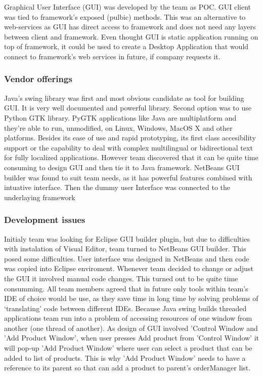 \documentclass[pdftex,11pt,a4paper]{article}
\begin{document}
Graphical User Interface (GUI) was developed by the team as POC. GUI client was tied to framework's exposed (pulbic) methods. This was an alternative to web-services as GUI has direct access to framework and does not need any layers between client and framework. Even thought GUI is static application running on top of framework, it could be used to create a Desktop Application that would connect to framework's web services in future, if company requests it.

\subsubsection{Vendor offerings}
Java's swing library was first and most obvious candidate as tool for building GUI. It is very well documented and powerful library. Second option was to use  Python GTK library. PyGTK applications like Java are multiplatform and they're able to run, unmodified, on Linux, Windows, MacOS X and other platforms.
Besides its ease of use and rapid prototyping, its first class accesibility support or the capability to deal with complex multilingual or bidirectional text for fully localized applications. However team discovered that it can be quite time consuming to design GUI and then tie it to Java framework.
NetBeans GUI builder was found to suit team needs, as it has powerful features combined with intuative interface. Then the dummy user Interface was connected to the underlaying framework

\subsubsection{Development issues}
Initialy team was looking for Eclipse GUI builder plugin, but due to difficulties with instalation of Visual Editor, team turned to NetBeans GUI builder. This posed some difficulties. User interface was designed in NetBeans and then code was copied into Eclipse enviroment. Whenever team decided to change or adjust the GUI it involved manual code changes. This turned out to be quite time consumming. All team members agreed that in future only tools within team's IDE of choice would be use, as they save time in long time by solving problems of `translating' code between different IDEs.
Because Java swing builds threaded applications team run into a problem of accessing resources of one window from another (one thread of another). As design of GUI involved 'Control Window and 'Add Product Window', when user presses Add product from 'Control Window' it will pop-up 'Add Product Window' where user can select a product that can be added to list of products. This is why 'Add Product Window' needs to have a reference to its parent so that can add a product to parent's orderManager list.
\end{document}
